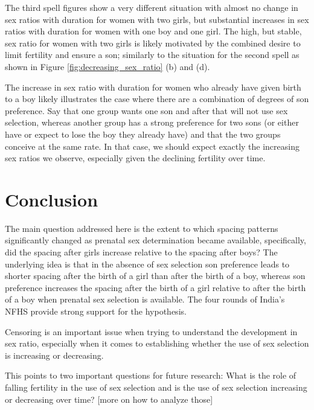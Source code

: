 \documentclass[12pt,letterpaper]{article}
\begin{document}
The third spell figures show a very different situation with almost no 
change in sex ratios with duration for women with two girls, but substantial 
increases in sex ratios with duration for women with one boy and one girl.
The high, but stable, sex ratio for women with two girls is likely 
motivated by the combined desire to limit fertility and ensure a son;
similarly to the situation for the second spell as shown in 
Figure \ref{fig:decreasing_sex_ratio} (b) and (d).

The increase in sex ratio with duration for women who already have
given birth to a boy likely illustrates the case where there are a
combination of degrees of son preference.
Say that one group wants one son and after that will not use sex
selection, whereas another group has a strong preference for two
sons (or either have or expect to lose the boy they already have)
and that the two groups conceive at the same rate.
In that case, we should expect exactly the increasing sex ratios
we observe, especially given the declining fertility over time.


\section{Conclusion\label{sec:conclusion}}


The main question addressed here is the extent to which spacing patterns 
significantly changed as prenatal sex determination became available,
specifically, did the spacing after girls increase relative to the spacing
after boys?
The underlying idea is that in the absence of sex selection son 
preference leads to shorter spacing after the birth of a girl than after the 
birth of a boy, whereas son preference increases the spacing after the birth 
of a girl relative to after the birth of a boy when prenatal sex selection is 
available.
The four rounds of India's NFHS provide strong support for the hypothesis.






Censoring is an important issue when trying to understand the development
in sex ratio, especially when it comes to establishing whether the
use of sex selection is increasing or decreasing.




This points to two important questions for future research:
What is the role of falling fertility in the use of sex selection
and is the use of sex selection increasing or decreasing over time?
[more on how to analyze those]
\end{document}
